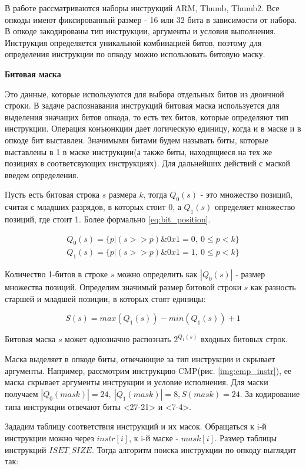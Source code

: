 
В работе рассматриваются наборы инструкций ARM, Thumb, Thumb2. Все опкоды имеют фиксированный размер - 16 или 32 бита в зависимости от набора. В опкоде закодированы тип инструкции, аргументы и условия выполнения. Инструкция определяется уникальной комбинацией битов, поэтому для определения инструкции по опкоду можно использовать битовую маску.


\textbf{Битовая маска}

Это данные, которые используются для выбора отдельных битов из двоичной строки. В задаче распознавания инструкций битовая маска используется для выделения значащих битов опкода, то есть тех битов, которые определяют тип инструкции. Операция конъюнкции дает логическую единицу, когда и в маске и в опкоде бит выставлен. Значимыми битами будем называть биты, которые выставлены в 1 в маске инструкции(а также биты, находящиеся на тех же позициях в соответсвующих инструкциях). Для дальнейших действий с маской введем определения.

Пусть есть битовая строка $s$ размера $k$, тогда $Q_0(s)$ - это множество позиций, считая с младших разрядов, в которых стоит 0, а $Q_1(s)$ определяет множество позиций, где стоит 1. Более формально \ref{eq:bit_position}.

\begin{eqnarray} \label{eq:bit_position}
	Q_0(s) = \{p | (s >> p) \& 0x1 = 0,\ 0 \le p < k\} \nonumber \\ 
	Q_1(s) = \{p | (s >> p) \& 0x1 = 1,\ 0 \le p < k\}
\end{eqnarray}

Количество 1-битов в строке $s$ можно определить как $|Q_0(s)|$ - размер множества позиций. Определим значимый размер битовой строки $s$ как разность старшей и младшей позиции, в которых стоят единицы:

\begin{equation}
	S(s) = max(Q_1(s)) - min(Q_1(s)) + 1
\end{equation}

Битовая маска $s$ может однозначно распознать $2^{Q_1(s)}$ входных битовых строк. 

Маска выделяет в опкоде биты, отвечающие за тип инструкции и скрывает аргументы. Например, рассмотрим инструкцию CMP(рис. \ref{img:cmp_instr}), ее маска скрывает аргументы инструкции и условие исполнения. Для маски получаем $|Q_0(mask)| = 24,\ |Q_1(mask)| = 8, S(mask) = 24$. За кодирование типа инструкции отвечают биты <27-21> и <7-4>.


Зададим таблицу соответствия инструкций и их масок. Обращаться к i-й инструкции можно через $instr[i]$, к i-й маске - $mask[i]$. Размер таблицы инструкций $ISET\_SIZE$. Тогда алгоритм поиска инструкции по опкоду выглядит так:

